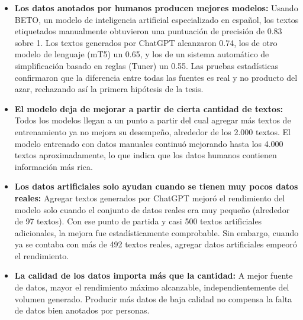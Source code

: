 \begin{itemize}
    \item \textbf{Los datos anotados por humanos producen mejores modelos:} Usando BETO, un modelo de inteligencia artificial especializado en español, los textos etiquetados manualmente obtuvieron una puntuación de precisión de 0.83 sobre 1. Los textos generados por ChatGPT alcanzaron 0.74, los de otro modelo de lenguaje (mT5) un 0.65, y los de un sistema automático de simplificación basado en reglas (Tuner) un 0.55. Las pruebas estadísticas confirmaron que la diferencia entre todas las fuentes es real y no producto del azar, rechazando así la primera hipótesis de la tesis.

    \item \textbf{El modelo deja de mejorar a partir de cierta cantidad de textos:} Todos los modelos llegan a un punto a partir del cual agregar más textos de entrenamiento ya no mejora su desempeño, alrededor de los 2.000 textos. El modelo entrenado con datos manuales continuó mejorando hasta los 4.000 textos aproximadamente, lo que indica que los datos humanos contienen información más rica.

    \item \textbf{Los datos artificiales solo ayudan cuando se tienen muy pocos datos reales:} Agregar textos generados por ChatGPT mejoró el rendimiento del modelo solo cuando el conjunto de datos reales era muy pequeño (alrededor de 97 textos). Con ese punto de partida y casi 500 textos artificiales adicionales, la mejora fue estadísticamente comprobable. Sin embargo, cuando ya se contaba con más de 492 textos reales, agregar datos artificiales empeoró el rendimiento.

    \item \textbf{La calidad de los datos importa más que la cantidad:} A mejor fuente de datos, mayor el rendimiento máximo alcanzable, independientemente del volumen generado. Producir más datos de baja calidad no compensa la falta de datos bien anotados por personas.
\end{itemize}

